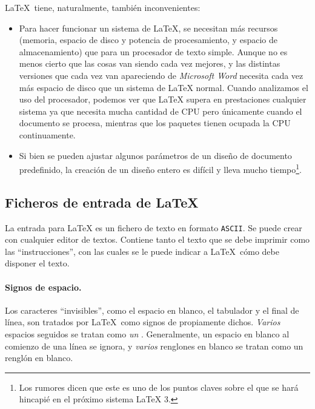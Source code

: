 \LaTeX\ tiene, naturalmente, también inconvenientes:

\begin{itemize}

\item  Para hacer  funcionar un  sistema de  \LaTeX, se  necesitan más
recursos (memoria,  espacio de  disco y  potencia de  procesamiento, y
espacio de  almacenamiento) que  para un  procesador de  texto simple.
Aunque  no  es  menos  cierto  que  las  cosas  van  siendo  cada  vez
mejores, y  las distintas  versiones que cada  vez van  apareciendo de
\emph{Microsoft Word}  necesita cada vez  más espacio de disco  que un
sistema de \LaTeX{}  normal. Cuando analizamos el  uso del procesador,
podemos  ver que  \LaTeX{}  supera en  prestaciones cualquier  sistema
 ya  que necesita  mucha cantidad  de CPU  pero únicamente
cuando el documento se procesa, mientras que los paquetes 
tienen ocupada la CPU continuamente.

\item Si  bien se pueden  ajustar algunos  parámetros de un  diseño de
documento predefinido,  la creación de  un diseño entero es  difícil y
lleva mucho tiempo\footnote{Los  rumores dicen que este es  uno de los
puntos claves  sobre el  que se  hará hincapié  en el  próximo sistema
LaTeX 3.}.

\end{itemize}

\subsection{Ficheros de entrada de \LaTeX}

La  entrada  para   \LaTeX{}  es  un  fichero  de   texto  en  formato
\texttt{ASCII}.  Se  puede  crear  con  cualquier  editor  de  textos.
Contiene   tanto   el   texto   que  se   debe   imprimir   como   las
``instrucciones'', con las  cuales se le puede indicar  a \LaTeX\ cómo
debe disponer el texto.

\paragraph{Signos de espacio.}

Los caracteres ``invisibles'', como el espacio en blanco, el tabulador
y  el  final  de  línea,  son tratados  por  \LaTeX\  como  signos  de
  propiamente dichos.  \emph{Varios} espacios  seguidos se
tratan  como \emph{un}  .  Generalmente,
un  espacio  en  blanco  al  comienzo   de  una  línea  se  ignora,  y
\emph{varios} renglones en blanco se tratan como un renglón en blanco.


